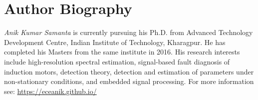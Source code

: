 \chapter*{Author Biography}

\vspace*{0.15\textheight}

{\em Anik Kumar Samanta} is currently pursuing his Ph.D. from Advanced Technology Development Centre, Indian Institute of Technology, Kharagpur. He has completed his Masters from the same institute in 2016. His research interests include high-resolution spectral estimation, signal-based fault diagnosis of induction motors, detection theory, detection and estimation of parameters under non-stationary conditions, and embedded signal processing. For more information see: \href{https://eceanik.github.io/}{https://eceanik.github.io/}
